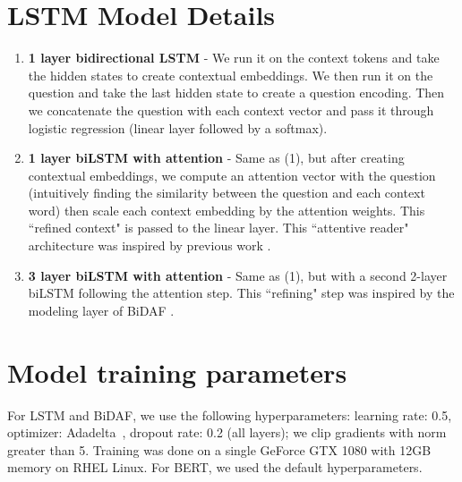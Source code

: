 \section{LSTM Model Details}
\label{sec:ablation}
\begin{enumerate}
	\item \textbf{1 layer bidirectional LSTM} - We run it on the context tokens and take the hidden states to create contextual embeddings. We then run it on the question and take the last hidden state to create a question encoding. Then we concatenate the question with each context vector and pass it through logistic regression (linear layer followed by a softmax).
	\item \textbf{1 layer biLSTM with attention} - Same as (1), but after creating contextual embeddings, we compute an attention vector \cite{weston2014memory, kadlec2016text} with the question (intuitively finding the similarity between the question and each context word) then scale each context embedding by the attention weights. This ``refined context" is passed to the linear layer. This ``attentive reader" architecture was inspired by previous work \cite{chen2016thorough, chen2017reading}.
	\item \textbf{3 layer biLSTM with attention} - Same as (1), but with a second 2-layer biLSTM following the attention step. This ``refining" step was inspired by the modeling layer of BiDAF \cite{seo2016bidirectional}.
\end{enumerate}

\section{Model training parameters}
For LSTM and BiDAF, we use the following hyperparameters: learning rate: 0.5, optimizer: Adadelta~\cite{zeiler2012adadelta}, dropout rate: 0.2 (all layers); we clip gradients with norm greater than 5. Training was done on a single GeForce GTX 1080 with 12GB memory on RHEL Linux.
For BERT, we used the default hyperparameters. 








